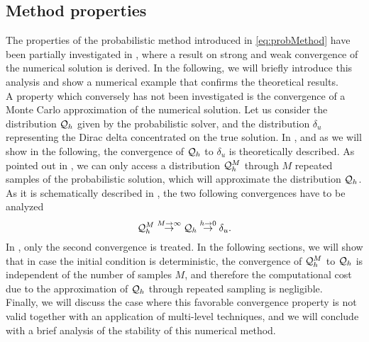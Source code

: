 \subsection{Method properties}
The properties of the probabilistic method introduced in \eqref{eq:probMethod} have been partially investigated in \cite{CGS16}, where a result on strong and weak convergence of the numerical solution is derived. In the following, we will briefly introduce this analysis and show a numerical example that confirms the theoretical results. \\
A property which conversely has not been investigated is the convergence of a Monte Carlo approximation of the numerical solution. Let us consider the distribution $\mathcal{Q}_h$ given by the probabilistic solver, and the distribution $\delta_u$ representing the Dirac delta concentrated on the true solution. In \cite{CGS16}, and as we will show in the following, the convergence of $\mathcal{Q}_h$ to $\delta_u$ is theoretically described. As pointed out in \cite{KeH16}, we can only access a distribution $\mathcal{Q}_h^M$ through $M$ repeated samples of the probabilistic solution, which will approximate the distribution $\mathcal{Q}_h$. As it is schematically described in \cite{KeH16}, the two following convergences have to be analyzed
\begin{equation}
	\mathcal{Q}_h^M \stackrel{M\to \infty}{\to} \mathcal{Q}_h \stackrel{h\to 0}{\to} \delta_u.
\end{equation}
In \cite{CGS16}, only the second convergence is treated. In the following sections, we will show that in case the initial condition is deterministic, the convergence of $\mathcal{Q}_h^M$ to $\mathcal{Q}_h$ is independent of the number of samples $M$, and therefore the computational cost due to the approximation of $\mathcal{Q}_h$ through repeated sampling is negligible. \\
Finally, we will discuss the case where this favorable convergence property is not valid together with an application of multi-level techniques, and we will conclude with a brief analysis of the stability of this numerical method. 










